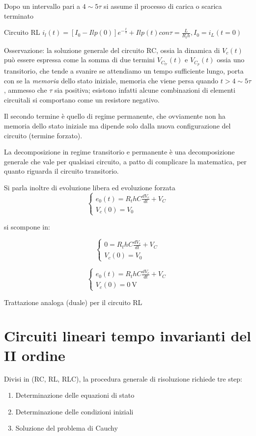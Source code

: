 Dopo un intervallo pari a $4\sim5 \tau$ si assume il processo di carica o scarica terminato

Circuito RL $i_l(t) = [I_0-Ilp(0)]e^{-\frac{t}{\tau}} + Ilp(t) con \tau = \frac{L}{R_th}, I_0 = i_L (t=0)$

Osservazione: la soluzione generale del circuito RC, ossia la dinamica di $V_c(t)$ può essere espressa come la somma di due termini $V_{C_{tr}}(t)$ e $V_{C_p}(t)$ ossia
uno transitorio, che tende a svanire se attendiamo un tempo sufficiente lungo, porta con se la \textit{memoria} dello stato iniziale, memoria che viene
persa quando $t>4\sim5\tau$, ammesso che $\tau$ sia positiva; esistono infatti alcune combinazioni di elementi circuitali si comportano come un resistore negativo.

Il secondo termine è quello di regime permanente, che ovviamente non ha memoria dello stato iniziale ma dipende solo dalla nuova configurazione
del circuito (termine forzato).

La decomposizione in regime transitorio e permanente è una decomposizione generale che vale per qualsiasi circuito, a patto di complicare la matematica,
per quanto riguarda il circuito transitorio.

Si parla inoltre di evoluzione libera ed evoluzione forzata 
$$\begin{cases}
e_0(t) = R_thC\frac{dV_c}{dt} + V_C \\
V_c(0) = V_0
\end{cases}$$

si scompone in:

$$\begin{cases} %
0 = R_thC\frac{dV_c}{dt} + V_C \\ 
V_c(0) = V_0
\end{cases}$$

$$\begin{cases} %
e_0(t) = R_thC\frac{dV_c}{dt} + V_C \\
V_c(0) = \SI{0}{\volt}
\end{cases}$$

Trattazione analoga (duale) per il circuito RL

\section{Circuiti lineari tempo invarianti del II ordine}
Divisi in (RC, RL, RLC), la procedura generale di risoluzione richiede tre step:
\begin{enumerate}
 \item Determinazione delle equazioni di stato
 \item Determinazione delle condizioni iniziali
 \item Soluzione del problema di Cauchy
\end{enumerate}

